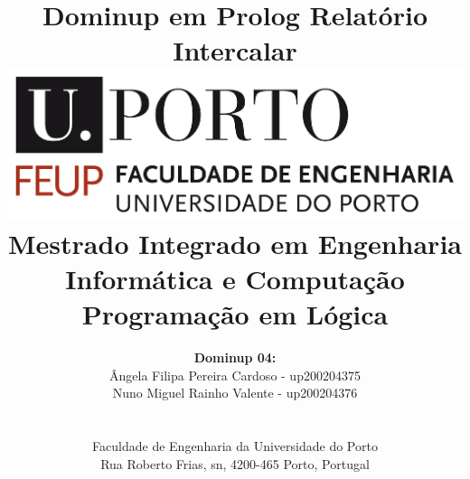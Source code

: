 \documentclass[a4paper]{article}
\begin{document}

\title{\Huge\textbf{Dominup em Prolog}\linebreak\linebreak\linebreak
\Large\textbf{Relatório Intercalar}\linebreak\linebreak
\linebreak\linebreak
\includegraphics[scale=0.1]{feup-logo.png}\linebreak\linebreak
\linebreak\linebreak
\Large{Mestrado Integrado em Engenharia Informática e Computação} \linebreak\linebreak
\Large{Programação em Lógica}\linebreak
}

\author{\textbf{Dominup 04:}\\
Ângela Filipa Pereira Cardoso - up200204375 \\
Nuno Miguel Rainho Valente - up200204376 \\
\linebreak\linebreak \\
 \\ Faculdade de Engenharia da Universidade do Porto \\ Rua Roberto Frias, s\/n, 4200-465 Porto, Portugal \linebreak\linebreak\linebreak
\linebreak\linebreak\vspace{1cm}}

\maketitle
\thispagestyle{empty}
\end{document}
